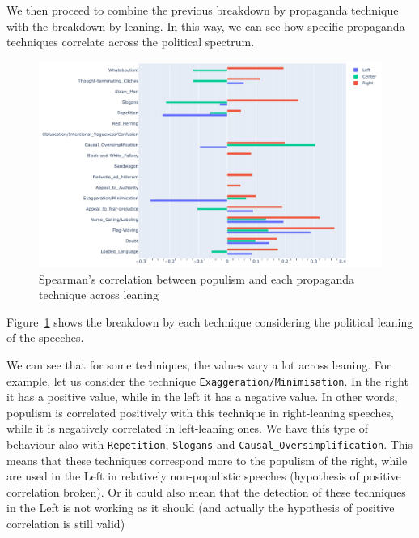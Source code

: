 

We then proceed to combine the previous breakdown by propaganda technique with the breakdown by leaning. In this way, we can see how specific propaganda techniques correlate across the political spectrum.

\begin{figure}[!htbp]
    \centering
    \includegraphics[width=\linewidth]{figures/populism_propaganda_correlation_by_leaning.pdf}
    \caption{Spearman's correlation between populism and each propaganda technique across leaning}
    \label{fig:populism_propaganda_correlation_by_leaning}
\end{figure}

Figure~\ref{fig:populism_propaganda_correlation_by_leaning} shows the breakdown by each technique considering the political leaning of the speeches.

We can see that for some techniques, the values vary a lot across leaning. For example, let us consider the technique \texttt{Exaggeration/Minimisation}. In the right it has a positive value, while in the left it has a negative value. %
In other words, populism is correlated positively with this technique in right-leaning speeches, while it is negatively correlated in left-leaning ones. We have this type of behaviour also with \texttt{Repetition}, \texttt{Slogans} and \texttt{Causal\_Oversimplification}. This means that these techniques correspond more to the populism of the right, while are used in the Left in relatively non-populistic speeches (hypothesis of positive correlation broken). Or it could also mean that the detection of these techniques in the Left is not working as it should (and actually the hypothesis of positive correlation is still valid)

